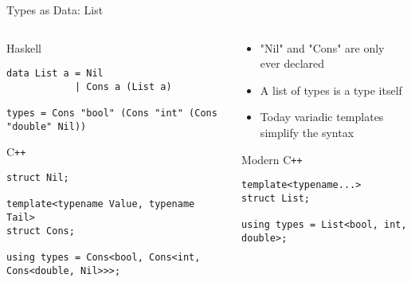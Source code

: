 \documentclass[aspectratio=169]{beamer}
\begin{document}

\begin{frame}[fragile]{Types as Data: List}
    
\begin{columns}[t] %
        \begin{column}{0.6\textwidth}
            \scriptsize
            \begin{block}{Haskell}
                \begin{verbatim}
data List a = Nil 
            | Cons a (List a)

types = Cons "bool" (Cons "int" (Cons "double" Nil))
                \end{verbatim}
            \end{block}
            
            \begin{block}{C\texttt{++}}
                \begin{verbatim}
struct Nil;

template<typename Value, typename Tail>
struct Cons;

using types = Cons<bool, Cons<int, Cons<double, Nil>>>;
                \end{verbatim}
            \end{block}
        \end{column}
        
        \begin{column}{0.4\textwidth}
            \begin{itemize}
                \item "Nil" and "Cons" are only ever declared
                \item A list of types is a type itself
                \pause
                \item Today variadic templates simplify the syntax
            \end{itemize}
            \scriptsize
            
            \begin{block}{Modern C\texttt{++}}
                \begin{verbatim}
template<typename...>
struct List;

using types = List<bool, int, double>;
                \end{verbatim}
            \end{block}
        \end{column}
\end{columns}

\end{frame}
\end{document}
